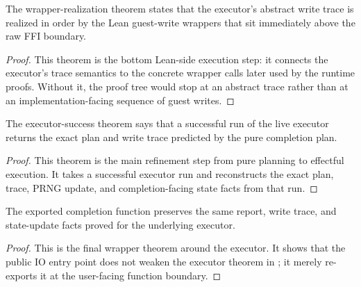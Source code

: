 \begin{theorem}
\label{thm:wrapper-trace-realization}
\leanok
The wrapper-realization theorem states that the executor's abstract write trace is realized in order by the Lean guest-write wrappers that sit immediately above the raw FFI boundary.
\end{theorem}

\begin{proof}
\leanok
{}
This theorem is the bottom Lean-side execution step: it connects the executor's trace semantics to the concrete wrapper calls later used by the runtime proofs.
Without it, the proof tree would stop at an abstract trace rather than at an implementation-facing sequence of guest writes.
\end{proof}

\begin{theorem}
\label{thm:executor-success-report}
\leanok
The executor-success theorem says that a successful run of the live executor returns the exact plan and write trace predicted by the pure completion plan.
\end{theorem}

\begin{proof}
\leanok
{}
This theorem is the main refinement step from pure planning to effectful execution.
It takes a successful executor run and reconstructs the exact plan, trace, PRNG update, and completion-facing state facts from that run.
\end{proof}

\begin{theorem}
\label{thm:public-completion-success}
\leanok
The exported completion function preserves the same report, write trace, and state-update facts proved for the underlying executor.
\end{theorem}

\begin{proof}
\leanok
{}
This is the final wrapper theorem around the executor.
It shows that the public IO entry point does not weaken the executor theorem in ; it merely re-exports it at the user-facing function boundary.
\end{proof}

